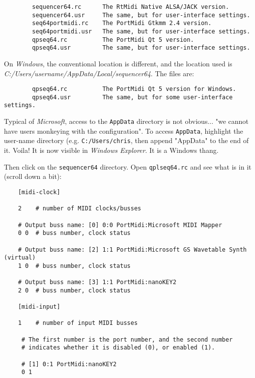 \begin{verbatim}
        sequencer64.rc      The RtMidi Native ALSA/JACK version.
        sequencer64.usr     The same, but for user-interface settings.
        seq64portmidi.rc    The PortMidi Gtkmm 2.4 version.
        seq64portmidi.usr   The same, but for user-interface settings.
        qpseq64.rc          The PortMidi Qt 5 version.
        qpseq64.usr         The same, but for user-interface settings.
\end{verbatim}

    On \textsl{Windows},
    the conventional location is different, and the location used
    is \textsl{C:/Users/username/AppData/Local/sequencer64}.
    The files are:

\begin{verbatim}
        qpseq64.rc          The PortMidi Qt 5 version for Windows.
        qpseq64.usr         The same, but for some user-interface settings.
\end{verbatim}

    Typical of \textsl{Microsoft}, access to the \texttt{AppData} directory
    is not obvious... "we cannot have users monkeying with the configuration".
    To access \texttt{AppData}, highlight the user-name directory
    (e.g. \texttt{C:/Users/chris}, then append
    "AppData" to the end of it.  Voila! It is now visible in
    \textsl{Windows Explorer}.
    It is a Windows thang.

    Then click on the \texttt{sequencer64} directory.
    Open \texttt{qplseq64.rc} and see what is in it (scroll down a bit):

\begin{verbatim}
    [midi-clock]

    2    # number of MIDI clocks/busses

    # Output buss name: [0] 0:0 PortMidi:Microsoft MIDI Mapper
    0 0  # buss number, clock status

    # Output buss name: [2] 1:1 PortMidi:Microsoft GS Wavetable Synth (virtual)
    1 0  # buss number, clock status

    # Output buss name: [3] 1:1 PortMidi:nanoKEY2
    2 0  # buss number, clock status
    
    [midi-input]
    
    1    # number of input MIDI busses

	 # The first number is the port number, and the second number
	 # indicates whether it is disabled (0), or enabled (1).

	 # [1] 0:1 PortMidi:nanoKEY2
	 0 1
\end{verbatim}

